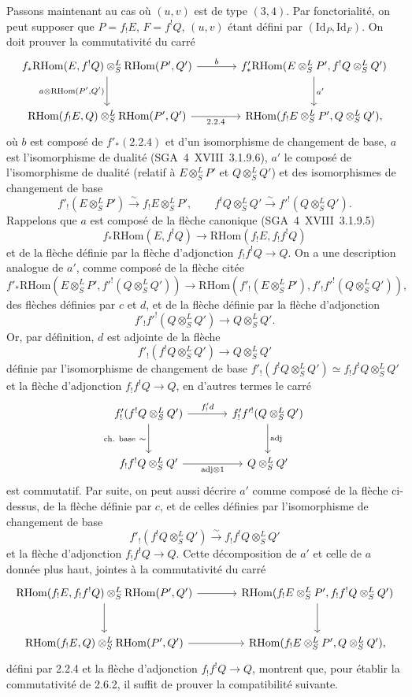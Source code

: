 \documentclass[11pt]{article}
\providecommand{\RHom}{\mathrm{RHom}}
\providecommand{\Id}{\mathrm{Id}}
\providecommand{\RHom}{\mathrm{RHom}}
\begin{document}
Passons maintenant au cas où $(u,v)$ est de type $(3,4)$. Par fonctorialité, on peut supposer que $P=f_{!}E$, $F=f^{!}Q$, $(u,v)$ étant défini par $(\Id_P,\Id_F)$. On doit prouver la commutativité du carré
\[
\begin{tikzcd}[column sep=large,row sep=large]
f_*\RHom(E,f^!Q)\otimes^L_S\RHom(P',Q') \arrow[r,"b"] \arrow[d,"{a\otimes\RHom(P',Q')}"'] & f'_*\RHom(E\otimes^L_SP',f^!Q\otimes^L_SQ') \arrow[d,"a'"]\\
\RHom(f_!E,Q)\otimes^L_S\RHom(P',Q') \arrow[r,"2.2.4"'] & \RHom(f_!E\otimes^L_SP',Q\otimes^L_SQ'),
\end{tikzcd}
\]
où $b$ est composé de $f'_*(2.2.4)$ et d'un isomorphisme de changement de base, $a$ est l'isomorphisme de dualité (SGA~4~XVIII~3.1.9.6), $a'$ le composé de l'isomorphisme de dualité (relatif à $E\otimes^L_SP'$ et $Q\otimes^L_SQ'$) et des isomorphismes de changement de base
\[
f'_!(E\otimes^L_SP')\xrightarrow{\sim}f_!E\otimes^L_SP',
\qquad
f^!Q\otimes^L_SQ'\xrightarrow{\sim}f'^!(Q\otimes^L_SQ').
\]
Rappelons que $a$ est composé de la flèche canonique (SGA~4~XVIII~3.1.9.5)
\[
f_*\RHom(E,f^!Q)\longrightarrow\RHom(f_!E,f_!f^!Q)
\]
et de la flèche définie par la flèche d'adjonction $f_!f^!Q\to Q$. On a une description analogue de $a'$, comme composé de la flèche citée
\[
f'_*\RHom(E\otimes^L_SP',f'^!(Q\otimes^L_SQ'))\longrightarrow
\RHom(f'_!(E\otimes^L_SP'),f'_!f'^!(Q\otimes^L_SQ')),
\]
des flèches définies par $c$ et $d$, et de la flèche définie par la flèche d'adjonction
\[
f'_!f'^!(Q\otimes^L_SQ')\longrightarrow Q\otimes^L_SQ'.
\]
Or, par définition, $d$ est adjointe de la flèche
\[
f'_!(f^!Q\otimes^L_SQ')\longrightarrow Q\otimes^L_SQ'
\]
définie par l'isomorphisme de changement de base $f'_!(f^!Q\otimes^L_SQ')\simeq f_!f^!Q\otimes^L_SQ'$ et la flèche d'adjonction $f_!f^!Q\to Q$, en d'autres termes le carré
\[
\begin{tikzcd}[column sep=large,row sep=large]
f'_!(f^!Q\otimes^L_SQ') \arrow[r,"{f'_!d}"] \arrow[d,"{\text{ch. base}\ \sim}"'] & f'_!f'^!(Q\otimes^L_SQ') \arrow[d,"\mathrm{adj}"]\\
f_!f^!Q\otimes^L_SQ' \arrow[r,"{\mathrm{adj}\otimes 1}"'] & Q\otimes^L_SQ'
\end{tikzcd}
\]
est commutatif. Par suite, on peut aussi décrire $a'$ comme composé de la flèche ci-dessus, de la flèche définie par $c$, et de celles définies par l'isomorphisme de changement de base
\[
f'_!(f^!Q\otimes^L_SQ')\xrightarrow{\sim}f_!f^!Q\otimes^L_SQ'
\]
et la flèche d'adjonction $f_!f^!Q\to Q$. Cette décomposition de $a'$ et celle de $a$ donnée plus haut, jointes à la commutativité du carré
\[
\begin{tikzcd}[column sep=large,row sep=large]
\RHom(f_!E,f_!f^!Q)\otimes^L_S\RHom(P',Q') \arrow[r] \arrow[d] & \RHom(f_!E\otimes^L_SP',f_!f^!Q\otimes^L_SQ') \arrow[d]\\
\RHom(f_!E,Q)\otimes^L_S\RHom(P',Q') \arrow[r] & \RHom(f_!E\otimes^L_SP',Q\otimes^L_SQ'),
\end{tikzcd}
\]
défini par 2.2.4 et la flèche d'adjonction $f_!f^!Q\to Q$, montrent que, pour établir la commutativité de 2.6.2, il suffit de prouver la compatibilité suivante.
\end{document}
